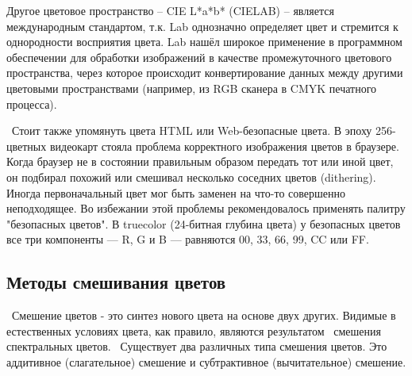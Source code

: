\begin{figure}[ht!]
\end{figure}

Другое цветовое пространство -- CIE L*a*b* (CIELAB) -- является международным стандартом, т.к. Lab однозначно определяет цвет и стремится к однородности восприятия цвета. Lab нашёл широкое применение в программном обеспечении для обработки изображений в качестве промежуточного цветового пространства, через которое происходит конвертирование данных между другими цветовыми пространствами (например, из RGB сканера в CMYK печатного процесса). 

 Стоит также упомянуть цвета HTML или Web-безопасные цвета. В эпоху 256-цветных видеокарт стояла проблема корректного изображения цветов в браузере. Когда браузер не в состоянии правильным образом передать тот или иной цвет, он подбирал похожий или смешивал несколько соседних цветов (dithering). Иногда первоначальный цвет мог быть заменен на что-то совершенно неподходящее. Во избежании этой проблемы рекомендовалось применять палитру "безопасных цветов". В truecolor (24-битная глубина цвета)  у безопасных цветов все три компоненты — R, G и B — равняются 00, 33, 66, 99, CC или FF. 
\subsection{Методы смешивания цветов}
 Смешение цветов - это синтез нового цвета на основе двух других.  Видимые в естественных условиях цвета, как правило, являются результатом
 смешения спектральных цветов.
 Существует два различных типа смешения цветов. Это аддитивное (слагательное) смешение и субтрактивное (вычитательное) смешение.
